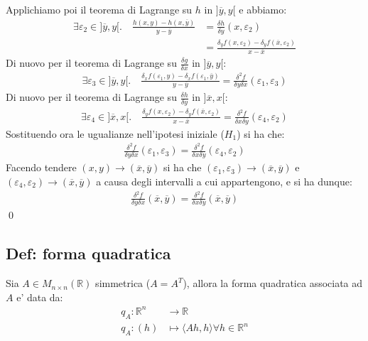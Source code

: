 \documentclass{article}
\begin{document}
Applichiamo poi il teorema di Lagrange su $h$ in $]\overline{y}, y[$ e abbiamo:
\begin{align*}
  \exists \varepsilon_2 \in ]\overline{y}, y[. \quad 
  \frac{h(x,y) - h(x, \overline{y})}{y-\overline{y}} &= \frac{\delta h}{\delta y}(x, \varepsilon_2) \\
  &= \frac{\delta_{y}f(x, \varepsilon_2) - \delta_{y}f(\overline{x}, \varepsilon_2)}{x - \overline{x}}
\end{align*}
Di nuovo per il teorema di Lagrange su $\frac{\delta g}{\delta x}$ in $]\overline{y}, y[$:
\begin{align*}
  \exists \varepsilon_3 \in ]\overline{y}, y[. \quad 
  \frac{\delta_{x}f(\varepsilon_1, y) - \delta_{x}f(\varepsilon_1, \overline{y})}{y - \overline{y}} =
  \frac{\delta^2 f}{\delta y \delta x}(\varepsilon_1, \varepsilon_3)
\end{align*}
Di nuovo per il teorema di Lagrange su $\frac{\delta h}{\delta y}$ in $]\overline{x}, x[$:
\begin{align*}
  \exists \varepsilon_4 \in ]\overline{x}, x[. \quad 
  \frac{\delta_{y}f(x, \varepsilon_2) - \delta_{y}f(\overline{x}, \varepsilon_2)}{x - \overline{x}} =
  \frac{\delta^2 f}{\delta x \delta y}(\varepsilon_4, \varepsilon_2)
\end{align*}
Sostituendo ora le ugualianze nell'ipotesi iniziale ($H_1$) si ha che:
\begin{align*}
  \frac{\delta^2 f}{\delta y \delta x}(\varepsilon_1, \varepsilon_3) =
  \frac{\delta^2 f}{\delta x \delta y}(\varepsilon_4, \varepsilon_2)
\end{align*}
Facendo tendere $(x, y) \to (\overline{x}, \overline{y})$ si ha che
$(\varepsilon_1, \varepsilon_3) \to (\overline{x}, \overline{y})$ e $(\varepsilon_4, \varepsilon_2)
\to (\overline{x}, \overline{y})$ a causa degli intervalli a cui appartengono, e si ha
dunque:
\begin{align*}
  \frac{\delta^2 f}{\delta y \delta x}(\overline{x}, \overline{y}) =
  \frac{\delta^2 f}{\delta x \delta y}(\overline{x}, \overline{y})
\end{align*}
\qed

\subsection{Def: forma quadratica}

Sia $A \in M_{n \times n} (\mathbb{R})$ simmetrica ($A = A^T$), allora la forma
quadratica associata ad $A$ e' data da:
\begin{align*}
  q_A: \mathbb{R}^n &\to \mathbb{R} \\
  q_A: (h) &\mapsto \langle Ah, h \rangle \forall h \in \mathbb{R}^n \\
\end{align*}
\end{document}
